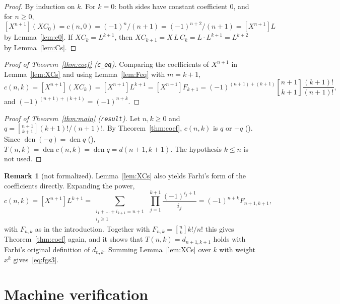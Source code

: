 \documentclass[11pt]{amsart}
\theoremstyle{plain}
\theoremstyle{definition}
\newtheorem{remark}[theorem]{Remark}
\newcommand{\den}{\operatorname{den}}
\newcommand{\st}[2]{\genfrac{[}{]}{0pt}{}{#1}{#2}}
\newcommand{\coef}[1]{[X^{#1}]}
\begin{document}
\begin{proof}
By induction on $k$. For $k=0$: both sides have constant coefficient $0$, and for $n\ge0$, $\coef{n+1}(XC_0)=c(n,0)=(-1)^n/(n+1)=(-1)^{n+2}/(n+1)=\coef{n+1}L$ by Lemma~\ref{lem:c0}. If $XC_k=L^{k+1}$, then $XC_{k+1}=X\,L\,C_k=L\cdot L^{k+1}=L^{k+2}$ by Lemma~\ref{lem:Cs}.
\end{proof}

\begin{proof}[Proof of Theorem~\ref{thm:coef} \textup{(\texttt{c\_eq})}]
Comparing the coefficients of $X^{n+1}$ in Lemma~\ref{lem:XCs} and using Lemma~\ref{lem:Feq} with $m=k+1$,
\[
  c(n,k)=\coef{n+1}(XC_k)=\coef{n+1}L^{k+1}=\coef{n+1}F_{k+1}=(-1)^{(n+1)+(k+1)}\st{n+1}{k+1}\frac{(k+1)!}{(n+1)!},
\]
and $(-1)^{(n+1)+(k+1)}=(-1)^{n+k}$.
\end{proof}

\begin{proof}[Proof of Theorem~\ref{thm:main} \textup{(\texttt{result})}]
Let $n,k\ge0$ and $q=\st{n+1}{k+1}(k+1)!/(n+1)!$. By Theorem~\ref{thm:coef}, $c(n,k)$ is $q$ or $-q$ (). Since $\den(-q)=\den q$ (), $T(n,k)=\den c(n,k)=\den q=d(n+1,k+1)$. The hypothesis $k\le n$ is not used.
\end{proof}

\begin{remark}[not formalized]\label{rem:farhi}
Lemma~\ref{lem:XCs} also yields Farhi's form of the coefficients directly. Expanding the power,
\[
  c(n,k)=\coef{n+1}L^{k+1}=\sum_{\substack{i_1+\dots+i_{k+1}=n+1\\ i_j\ge1}}\ \prod_{j=1}^{k+1}\frac{(-1)^{i_j+1}}{i_j}=(-1)^{n+k}F_{n+1,k+1},
\]
with $F_{n,k}$ as in the introduction. Together with $F_{n,k}=\st nk k!/n!$ \cite[Prop.~4.1]{Fa19} this gives Theorem~\ref{thm:coef} again, and it shows that $T(n,k)=d_{n+1,k+1}$ holds with Farhi's original definition of $d_{n,k}$. Summing Lemma~\ref{lem:XCs} over $k$ with weight $x^k$ gives~\eqref{eq:fgs3}.
\end{remark}

\section{Machine verification}\label{sec:lean}
\end{document}
